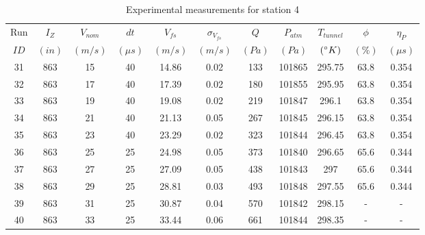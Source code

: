 \renewcommand\baselinestretch{1.3}\selectfont
\begin{table}[H]
\begin{center}
\begin{tabular}{|ccccccccccc|}
	\hline
	Run & $I_Z$ & $V_{nom}$ & $dt$ & $V_{fs}$ & $\sigma_{V_{fs}}$ & $Q$ & $P_{atm}$ & $T_{tunnel}$ & $\phi$ & $\eta_P$\\
	$ID$ & $(in)$ & $(m/s)$ & $(\mu s)$ & $(m/s)$ & $(m/s)$ & $(Pa)$ & $(Pa)$ & $(\degree K)$ & $(\%)$ & $(\mu s)$\\
	\hline
	31 & 863 & 15 & 40 & 14.86 & 0.02 & 133 & 101865 & 295.75 & 63.8 & 0.354\\
	32 & 863 & 17 & 40 & 17.39 & 0.02 & 180 & 101855 & 295.95 & 63.8 & 0.354\\
	33 & 863 & 19 & 40 & 19.08 & 0.02 & 219 & 101847 & 296.1 & 63.8 & 0.354\\
	34 & 863 & 21 & 40 & 21.13 & 0.05 & 267 & 101845 & 296.15 & 63.8 & 0.354\\
	35 & 863 & 23 & 40 & 23.29 & 0.02 & 323 & 101844 & 296.45 & 63.8 & 0.354\\
	36 & 863 & 25 & 25 & 24.98 & 0.05 & 373 & 101840 & 296.65 & 65.6 & 0.344\\
	37 & 863 & 27 & 25 & 27.09 & 0.05 & 438 & 101843 & 297 & 65.6 & 0.344\\
	38 & 863 & 29 & 25 & 28.81 & 0.03 & 493 & 101848 & 297.55 & 65.6 & 0.344\\
	39 & 863 & 31 & 25 & 30.87 & 0.04 & 570 & 101842 & 298.15 & - & -\\
	40 & 863 & 33 & 25 & 33.44 & 0.06 & 661 & 101844 & 298.35 & - & -\\
	\hline
\end{tabular}
\caption{Experimental measurements for station 4}
\label{table:station_4_measurements}
\end{center}
\end{table}
\renewcommand\baselinestretch{2}\selectfont
